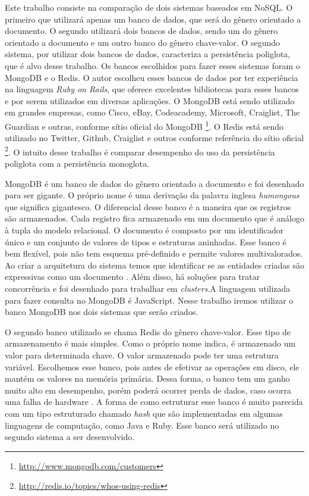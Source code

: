 Este trabalho consiste na comparação de dois sistemas baseados em NoSQL. O primeiro que utilizará apenas um banco de dados, que será do gênero orientado a documento. O segundo utilizará dois bancos de dados, sendo um do gênero orientado a documento e um outro banco do gênero chave-valor. O segundo sistema, por utilizar dois bancos de dados, caracteriza a persistência poliglota, que é alvo desse trabalho. Os bancos escolhidos para fazer esses sistemas foram o MongoDB e o \ac{Redis}. O autor escolheu esses bancos de dados por ter experiência na linguagem \textit{Ruby on Rails}, que oferece excelentes bibliotecas para esses bancos e por serem utilizados em diversas aplicações. O MongoDB está sendo utilizado em grandes empresas, como Cisco, eBay, Codeacademy, Microsoft, Craiglist, The Guardian e outras, conforme sítio oficial do MongoDB \footnote{\url{http://www.mongodb.com/customers}}. O \ac{Redis} está sendo utilizado no Twitter, Github, Craiglist e outros conforme referência do sítio oficial \footnote{\url{http://redis.io/topics/whos-using-redis}}.
O intuito desse trabalho é comparar desempenho do uso da persistência poliglota  com a persistência monoglota.

MongoDB é um banco de dados do gênero orientado a documento e foi desenhado para ser gigante. O próprio nome é uma derivação da palavra inglesa \textit{humongous} que significa gigantesco. O diferencial desse banco é a maneira que os registros são armazenados. Cada registro fica armazenado em um documento que é análogo à tupla do modelo relacional. O documento é composto por um identificador único e um conjunto de valores de tipos e estruturas aninhadas. Esse banco é bem flexível, pois não tem esquema pré-definido e permite valores multivalorados. Ao criar a arquitetura do sistema temos que identificar se as entidades criadas são expressivas como um documento \cite{SDSW}. Além disso, há soluções para tratar concorrência e foi desenhado para trabalhar em \textit{clusters}.A linguagem utilizada para fazer consulta no MongoDB é JavaScript. Nesse trabalho iremos utilizar o banco MongoDB nos dois sistemas que serão criados.

O segundo banco utilizado se chama \ac{Redis} do gênero chave-valor. Esse tipo de armazenamento é mais simples. Como o próprio nome indica, é armazenado um valor para determinada chave. O valor armazenado pode ter uma estrutura variável. Escolhemos esse banco, pois antes de efetivar as operações em disco, ele mantém os valores na memória primária. Dessa forma, o banco tem um ganho muito alto em desempenho, porém poderá ocorrer perda de dados, caso ocorra uma falha de hardware \cite{SDSW}. A forma de como estruturar esse banco é muito parecida com um tipo estruturado chamado \textit{hash} que são implementadas em algumas linguagens de computação, como Java e Ruby. Esse banco será utilizado no segundo sistema a ser desenvolvido.


